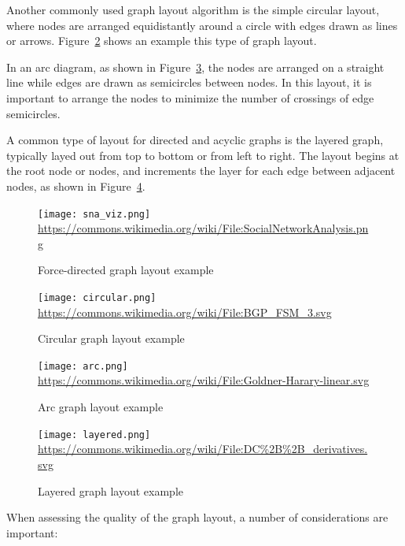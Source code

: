 Another commonly used graph layout algorithm is the simple circular layout, where nodes are arranged equidistantly around a circle with edges drawn as lines or arrows. Figure~\ref{fig:circular} shows an example this type of graph layout.

In an arc diagram, as shown in Figure~\ref{fig:arc}, the nodes are arranged on a straight line while edges are drawn as semicircles between nodes. In this layout, it is important to arrange the nodes to minimize the number of crossings of edge semicircles. 

A common type of layout for directed and acyclic graphs is the layered graph, typically layed out from top to bottom or from left to right. The layout begins at the root node or nodes, and increments the layer for each edge between adjacent nodes, as shown in Figure~\ref{fig:layered}.

\begin{figure}
\centering
\texttt{[image: sna\_viz.png]} \\

\scriptsize \url{https://commons.wikimedia.org/wiki/File:SocialNetworkAnalysis.png}
\caption{Force-directed graph layout example} 
\label{fig:sna_viz}
\end{figure}

\begin{figure}
\centering
\texttt{[image: circular.png]} \\

\scriptsize \url{https://commons.wikimedia.org/wiki/File:BGP_FSM_3.svg}
\caption{Circular graph layout example} 
\label{fig:circular}
\end{figure}

\begin{figure}
\centering
\texttt{[image: arc.png]} \\

\scriptsize \url{https://commons.wikimedia.org/wiki/File:Goldner-Harary-linear.svg}
\caption{Arc graph layout example} 
\label{fig:arc}
\end{figure}

\begin{figure}
\centering
\texttt{[image: layered.png]} \\

\scriptsize \url{https://commons.wikimedia.org/wiki/File:DC\%2B\%2B\_derivatives.svg}
\caption{Layered graph layout example} 
\label{fig:layered}
\end{figure}

\noindent When assessing the quality of the graph layout, a number of considerations are important:

